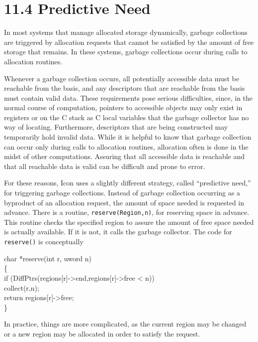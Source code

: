 \section[11.4 Predictive Need]{11.4 Predictive Need}

In most systems that manage allocated storage dynamically, garbage
collections are triggered by allocation requests that cannot be
satisfied by the amount of free storage that remains. In these
systems, garbage collections occur during calls to allocation routines.

Whenever a garbage collection occurs, all potentially accessible data
must be reachable from the basis, and any descriptors that are
reachable from the basis must contain valid data. These requirements
pose serious difficulties, since, in the normal course of computation,
pointers to accessible objects may only exist in registers or on the C
stack as C local variables that the garbage collector has no way of
locating. Furthermore, descriptors that are being constructed may
temporarily hold invalid data. While it is helpful to know that
garbage collection can occur only during calls to allocation routines,
allocation often is done in the midst of other computations. Assuring
that all accessible data is reachable and that all reachable data is
valid can be difficult and prone to error.

For these reasons, Icon uses a slightly different strategy, called
``predictive need,'' for triggering garbage collections. Instead of
garbage collection occurring as a byproduct of an allocation request,
the amount of space needed is requested in advance. There is a
routine, \texttt{reserve(Region,n)}, for reserving space in
advance. This routine checks the specified region to assure the amount
of free space needed is actually available. If it is not, it calls the
garbage collector. The code for \texttt{reserve()} is conceptually

\begin{iconcode}
\>char *reserve(int r, uword n)\\
\>\{\\
\>\>if (DiffPtrs(regions[r]->end,regions[r]->free < n))\\
\>\>\>collect(r,n);\\
\>\>return regions[r]->free;\\
\>\}
\end{iconcode}

\noindent
In practice, things are more complicated, as the current region may be
changed or a new region may be allocated in order to satisfy the
request.


